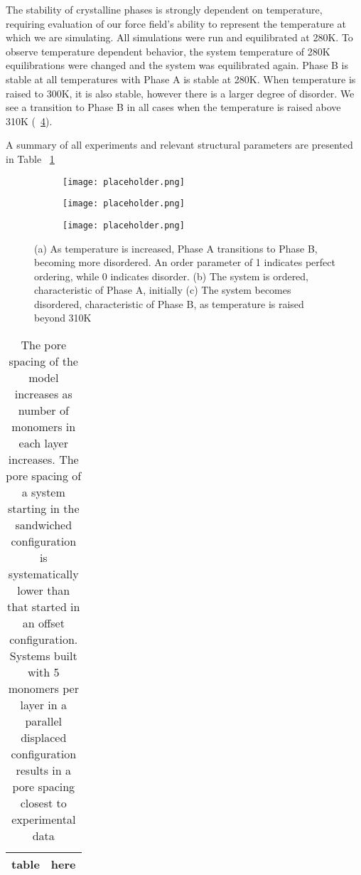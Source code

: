 The stability of crystalline phases is strongly dependent on temperature,
requiring evaluation of our force field's ability to represent the 
temperature at which we are simulating. All simulations were run and 
equilibrated at 280K. To observe temperature dependent behavior, 
the system temperature of 280K equilibrations were changed and the system
was equilibrated again. Phase B is stable at all temperatures with 
Phase A is stable at 280K. When temperature is raised to 300K, it is also
stable, however there is a larger degree of disorder. We see a transition
to Phase B in all cases when the temperature is raised above 310K 
(~\ref{fig:transition}). 

	A summary of all experiments and relevant structural parameters are presented in Table ~\ref{table:p2p}

\begin{figure}
\centering
\begin{subfigure}{0.3\textwidth}
	\centering
	\texttt{[image: placeholder.png]}
	\caption{}\label{fig:orderparameter}
\end{subfigure}
\begin{subfigure}{0.3\textwidth}
	\centering
	\texttt{[image: placeholder.png]}
	\caption{}\label{fig:order}
\end{subfigure}
\begin{subfigure}{0.3\textwidth}
	\centering
	\texttt{[image: placeholder.png]}
	\caption{}\label{fig:disorder}
\end{subfigure}
\caption{(a) As temperature is increased, Phase A transitions to Phase B, becoming more disordered. An order parameter of 1 indicates perfect ordering, while 0 indicates disorder. (b) The system is ordered, characteristic of Phase A, initially (c) The system becomes disordered, characteristic of Phase B, as temperature is raised beyond 310K}\label{fig:transition}
\end{figure}	

\begin{table}
\centering
\begin{tabular}{|c|c|}
\hline
table & here \\
\hline
\end{tabular}
\caption{The pore spacing of the model increases as number of monomers in each layer increases. The pore spacing of a system starting in the sandwiched configuration is systematically lower than that started in an offset configuration. Systems built with 5 monomers per layer in a parallel displaced configuration results in a pore spacing closest to experimental data}\label{table:p2p} 
\end{table}
	
